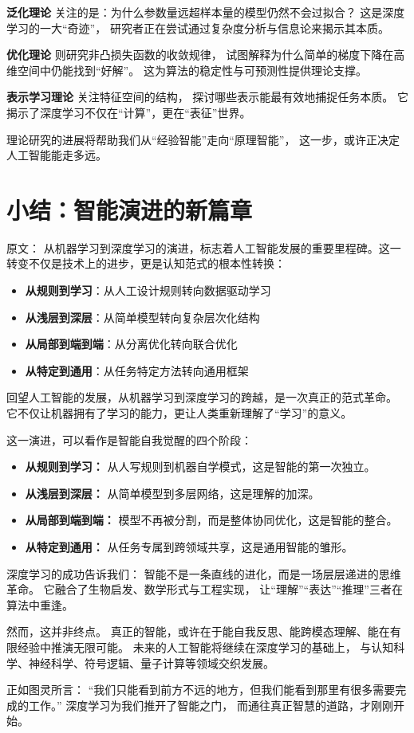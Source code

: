 {\bf 泛化理论} 关注的是：为什么参数量远超样本量的模型仍然不会过拟合？  
这是深度学习的一大“奇迹”，  
研究者正在尝试通过复杂度分析与信息论来揭示其本质。  

{\bf 优化理论} 则研究非凸损失函数的收敛规律，  
试图解释为什么简单的梯度下降在高维空间中仍能找到“好解”。  
这为算法的稳定性与可预测性提供理论支撑。  

{\bf 表示学习理论} 关注特征空间的结构，  
探讨哪些表示能最有效地捕捉任务本质。  
它揭示了深度学习不仅在“计算”，更在“表征”世界。  

理论研究的进展将帮助我们从“经验智能”走向“原理智能”，  
这一步，或许正决定人工智能能走多远。


\section{小结：智能演进的新篇章}

原文：
从机器学习到深度学习的演进，标志着人工智能发展的重要里程碑。这一转变不仅是技术上的进步，更是认知范式的根本性转换：
\begin{itemize}
\item {\bf 从规则到学习}：从人工设计规则转向数据驱动学习
\item {\bf 从浅层到深层}：从简单模型转向复杂层次化结构
\item {\bf 从局部到端到端}：从分离优化转向联合优化
\item {\bf 从特定到通用}：从任务特定方法转向通用框架
\end{itemize}
回望人工智能的发展，从机器学习到深度学习的跨越，是一次真正的范式革命。  
它不仅让机器拥有了学习的能力，更让人类重新理解了“学习”的意义。  

这一演进，可以看作是智能自我觉醒的四个阶段：  
\begin{itemize}
\item {\bf 从规则到学习：} 从人写规则到机器自学模式，这是智能的第一次独立。  
\item {\bf 从浅层到深层：} 从简单模型到多层网络，这是理解的加深。  
\item {\bf 从局部到端到端：} 模型不再被分割，而是整体协同优化，这是智能的整合。  
\item {\bf 从特定到通用：} 从任务专属到跨领域共享，这是通用智能的雏形。  
\end{itemize}

深度学习的成功告诉我们：  
智能不是一条直线的进化，而是一场层层递进的思维革命。  
它融合了生物启发、数学形式与工程实现，  
让“理解”“表达”“推理”三者在算法中重逢。  

然而，这并非终点。  
真正的智能，或许在于能自我反思、能跨模态理解、能在有限经验中推演无限可能。  
未来的人工智能将继续在深度学习的基础上，  
与认知科学、神经科学、符号逻辑、量子计算等领域交织发展。  

正如图灵所言：  
“我们只能看到前方不远的地方，但我们能看到那里有很多需要完成的工作。”  
深度学习为我们推开了智能之门，  
而通往真正智慧的道路，才刚刚开始。

\nocite{*}
\newpage


